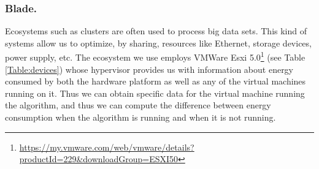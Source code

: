 \subsubsection*{Blade.}

Ecosystems such as clusters are often used to process big data sets. This kind of systems allow us to optimize, by sharing, resources like Ethernet, storage devices, power supply, etc. %
The ecosystem we use employs VMWare Esxi 5.0\footnote{\url{https://my.vmware.com/web/vmware/details?productId=229&downloadGroup=ESXI50}} (see Table \ref{Table:devices}) whose hypervisor provides us with information about energy consumed by both the hardware platform as well as any of the virtual machines running on it.  Thus we can obtain specific data for the virtual machine running the algorithm, and thus we can compute the difference between energy consumption when the algorithm is running and when it is not running.  







